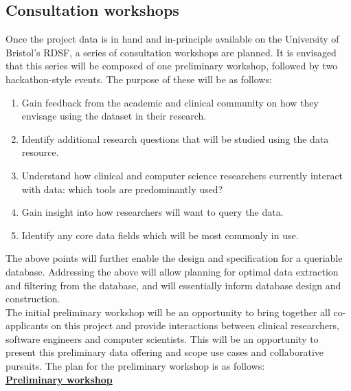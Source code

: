 \documentclass{article}
\begin{document}
\subsection{Consultation workshops}

Once the project data is in hand and in-principle available on the
University of Bristol's RDSF, a series of consultation workshops are
planned. It is envisaged that this series will be composed of one
preliminary workshop, followed by two hackathon-style events.
The purpose of these will be as follows:

\begin{enumerate}
\item Gain feedback from the academic and clinical
  community on how they envisage using the dataset in their
  research. 
\item Identify additional research questions that will be studied using the data
  resource.
\item Understand how clinical and computer science researchers
  currently interact with data: which tools are predominantly used?
\item Gain insight into how researchers will want to query the
  data.
\item Identify any core data fields which will be most commonly
  in use.
\end{enumerate}

The above points will further enable the design and specification for
a queriable database. Addressing the above will allow planning for
optimal data extraction and filtering from the database, and will
essentially inform database design and construction.\\

The initial preliminary workshop will be an opportunity to bring
together all co-applicants on this project and provide interactions
between clinical researchers, software engineers and computer
scientists. This will be an opportunity to present this preliminary
data offering and scope use cases and collaborative pursuits. The plan
for the preliminary workshop is as follows:\\

\noindent\textbf{\underline{Preliminary workshop}}\\
\end{document}

